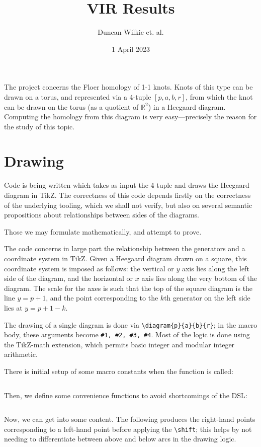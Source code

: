 \documentclass{article}
\title{VIR Results}
\author{Duncan Wilkie et. al.}
\date{1 April 2023}
\begin{document}
\maketitle

The project concerns the Floer homology of 1-1 knots.
Knots of this type can be drawn on a torus, and represented via a 4-tuple $[p, a, b, r]$,
from which the knot can be drawn on the torus (as a quotient of $\mathbb{R}^{2}$) in a Heegaard diagram.
Computing the homology from this diagram is very easy---precisely the reason for the study of this topic.

\section{Drawing}

Code is being written which takes as input the 4-tuple and draws the Heegaard diagram in TikZ.
The correctness of this code depends firstly on the correctness of the underlying tooling,
which we shall not verify,
but also on several semantic propositions about relationships between sides of the diagrams.

Those we may formulate mathematically, and attempt to prove.

The code concerns in large part the relationship between the generators and a coordinate system in TikZ.
Given a Heegaard diagram drawn on a square, this coordinate system is imposed as follows:
the vertical or $y$ axis lies along the left side of the diagram, and the horizontal or $x$ axis
lies along the very bottom of the diagram.
The scale for the axes is such that the top of the square diagram is the line $y = p+1$,
and the point corresponding to the $k$th generator on the left side lies at $y = p + 1 - k$.

The drawing of a single diagram is done via \verb|\diagram{p}{a}{b}{r}|; in the macro body, these arguments become \verb|#1, #2, #3, #4|.
Most of the logic is done using the TikZ-math extension, which permits basic integer and modular integer arithmetic.

There is initial setup of some macro constants when the function is called:
\inputminted[firstline=11, lastline=40]{tex}{../draw/draw.tex}

Then, we define some convenience functions to avoid shortcomings of the DSL:
\inputminted[firstline=41, lastline=57]{tex}{../draw/draw.tex}

Now, we can get into some content.
The following produces the right-hand points corresponding to a left-hand point before applying the \verb|\shift|;
this helps by not needing to differentiate between above and below arcs in the drawing logic.
\inputminted[firstline=58, lastline=69]{tex}{../draw/draw.tex}
\end{document}
